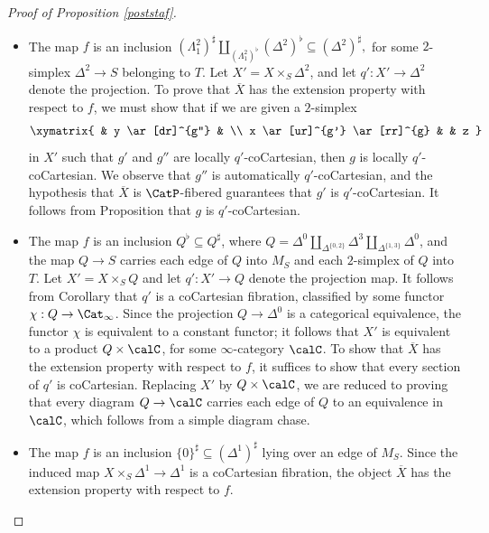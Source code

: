 \begin{proof}[Proof of Proposition \ref{poststaf}]
\begin{itemize}
\item[$(A_0)$] The map $f$ is an inclusion $( \Lambda^2_1)^{\sharp} \coprod_{ (\Lambda^2_{1})^{\flat}} (\Delta^2)^{\flat}  \subseteq (\Delta^2)^{\sharp},$ for some $2$-simplex $\Delta^2 \rightarrow S$
belonging to $T$. Let $X' = X \times_{S} \Delta^2$, and let $q': X' \rightarrow \Delta^2$ denote the projection. To prove that $\overline{X}$ has the extension property with respect to $f$, we must show that if we are given a $2$-simplex 
$$\xymatrix{ & y \ar[dr]^{g''} & \\
x \ar[ur]^{g'} \ar[rr]^{g} & & z }$$
in $X'$ such that $g'$ and $g''$ are locally $q'$-coCartesian, then $g$ is locally $q'$-coCartesian.
We observe that $g''$ is automatically $q'$-coCartesian, and the hypothesis that
$\overline{X}$ is $\CatP$-fibered guarantees that $g'$ is $q'$-coCartesian. It follows from
Proposition  that $g$ is $q'$-coCartesian.


\item[$(A_1)$] The map $f$ is an inclusion $Q^{\flat} \subseteq Q^{\sharp}$, where
$Q = \Delta^0 \coprod_{ \Delta^{ \{0,2\} }} \Delta^3 \coprod_{ \Delta^{ \{1,3\} }} \Delta^0$,
and the map $Q \rightarrow S$ carries each edge of $Q$ into $M_S$ and each $2$-simplex of
$Q$ into $T$. Let $X' = X \times_{S} Q$ and let $q': X' \rightarrow Q$ denote the projection map.
It follows from Corollary  that $q'$ is a coCartesian fibration, classified
by some functor $\chi: Q \rightarrow \Cat_{\infty}$. Since the projection $Q \rightarrow \Delta^0$ is a categorical equivalence, the functor $\chi$ is equivalent to a constant functor; it follows that
$X'$ is equivalent to a product $Q \times \calC$, for some $\infty$-category $\calC$.
To show that $\overline{X}$ has the extension property with respect to $f$, it suffices to show that
every section of $q'$ is coCartesian. Replacing $X'$ by $Q \times \calC$, we are reduced to proving
that every diagram $Q \rightarrow \calC$ carries each edge of $Q$ to an equivalence in $\calC$, which follows from a simple diagram chase.

\item[$(B_0)$] The map $f$ is an inclusion $\{0\}^{\sharp} \subseteq (\Delta^1)^{\sharp}$ lying over an
edge of $M_S$. Since the induced map $X \times_{S} \Delta^1 \rightarrow \Delta^1$ is a coCartesian fibration, the object $\overline{X}$ has the extension property with respect to $f$.


\end{itemize}
\end{proof}
